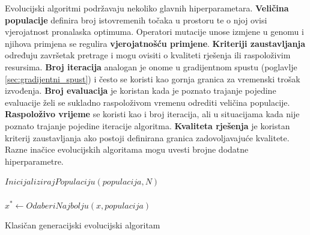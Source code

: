 \documentclass[times, utf8, numeric, diplomski]{fer}
\def\secref#1{(poglavlje \ref{#1})}
\begin{document}
Evolucijski algoritmi podržavaju nekoliko glavnih hiperparametara. \textbf{Veličina populacije} definira broj istovremenih točaka u prostoru te o njoj ovisi vjerojatnost pronalaska optimuma. Operatori mutacije unose izmjene u genomu i njihova primjena se regulira \textbf{vjerojatnošću primjene}. \textbf{Kriteriji zaustavljanja} određuju završetak pretrage i mogu ovisiti o kvaliteti rješenja ili raspoloživim resursima. \textbf{Broj iteracija} analogan je onome u gradijentnom spustu \secref{sec:gradijentni_spust} i često se koristi kao gornja granica za vremenski trošak izvođenja. \textbf{Broj evaluacija} je koristan kada je poznato trajanje pojedine evaluacije želi se sukladno raspoloživom vremenu odrediti veličina populacije. \textbf{Raspoloživo vrijeme} se koristi kao i broj iteracija, ali u situacijama kada nije poznato trajanje pojedine iteracije algoritma. \textbf{Kvaliteta rješenja} je koristan kriterij zaustavljanja ako postoji definirana granica zadovoljavajuće kvalitete. Razne inačice evolucijskih algoritama mogu uvesti brojne dodatne hiperparametre.

\begin{algorithm}[H]
\begin{algorithmic}
$InicijalizirajPopulaciju(populacija, N)$ \\
  \ENDWHILE \\
$x^* \gets OdaberiNajbolju(x, populacija)$ \\
\end{algorithmic}
\caption{Klasičan generacijski evolucijski algoritam}
\label{alg:ea}
\end{algorithm}
\end{document}
